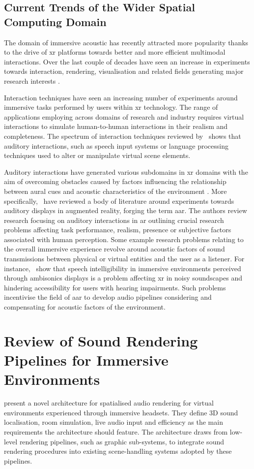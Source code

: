\subsection{Current Trends of the Wider Spatial Computing Domain}
The domain of immersive acoustic has recently attracted more popularity thanks to the drive of \acrshort{xr} platforms towards better and more efficient multimodal interactions. Over the last couple of decades have seen an increase in experiments towards interaction, rendering, visualisation and related fields generating major research interests \citep{kim2018revisiting}.\par
Interaction techniques have seen an increasing number of experiments around immersive tasks performed by users within \acrshort{xr} technology. The range of applications employing  across domains of research and industry requires virtual interactions to simulate human-to-human interactions in their realism and completeness. The spectrum of interaction techniques reviewed by~\cite{spittle2022review} shows that auditory interactions, such as speech input systems or language processing techniques used to alter or manipulate virtual scene elements.\par
Auditory interactions have generated various subdomains in \acrshort{xr} domains with the aim of overcoming obstacles caused by factors influencing the relationship between aural cues and acoustic characteristics of the environment \citep{park2022metaverse}.
More specifically,~\cite{yang2022audio} have reviewed a body of literature around experiments towards auditory displays in augmented reality, forging the term \acrfull{aar}. The authors review research focusing on auditory interactions in \acrshort{ar} outlining crucial research problems affecting task performance, realism, presence or subjective factors associated with human perception. Some example research problems relating to the overall immersive experience revolve around acoustic factors of sound transmissions between physical or virtual entities and the user as a listener. For instance,~\cite{mansour2021speech} show that speech intelligibility in immersive environments perceived through ambisonics displays is a problem affecting \acrshort{xr} in noisy soundscapes and hindering accessibility for users with hearing impairments. Such problems incentivise the field of \acrshort{aar} to develop audio pipelines considering and compensating for acoustic factors of the environment.\par

\section{Review of Sound Rendering Pipelines for Immersive Environments}\label{sec:lr-visual-acoustic-mapping}
\cite{naef2002spatialized} present a novel architecture for spatialised audio rendering for virtual environments experienced through immersive headsets. They define 3D sound localisation, room simulation, live audio input and efficiency as the main requirements the architecture should feature. The architecture draws from low-level rendering pipelines, such as graphic sub-systems, to integrate sound rendering procedures into existing scene-handling systems adopted by these pipelines. 



